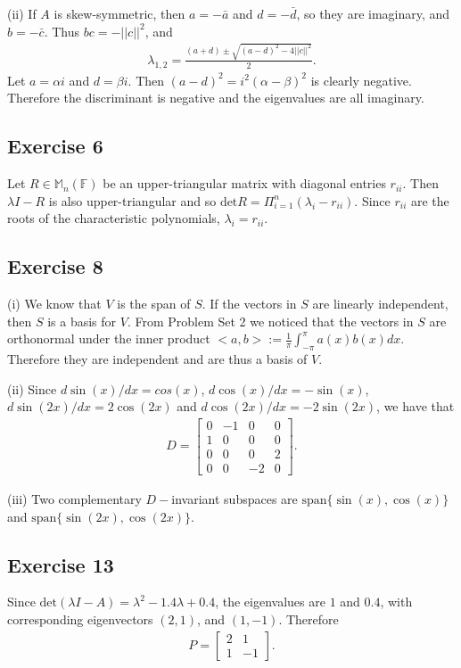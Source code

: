 \documentclass[11.5pt, letterpaper, bibtotoc,
    tablecaptionabove, figurecaptionabove]{article}
\begin{document}
(ii)
If $A$ is skew-symmetric, then $a=-\bar{a}$ and $d=-\bar{d}$, so they are imaginary, and $b=-\bar{c}$.
Thus $bc=-||c||^2$, and 
\begin{align*}
    \lambda_{1,2} = \frac{(a + d) \pm \sqrt{(a - d)^2 - 4||c||^2}}{2}.
\end{align*}
Let $a=\alpha i$ and $d=\beta i$. Then $(a-d)^2=i^2(\alpha-\beta)^2$ is clearly negative.
Therefore the discriminant is negative and the eigenvalues are all imaginary.

\subsection*{Exercise 6}
Let $R\in\mathbb M_n(\mathbb F)$ be an upper-triangular matrix with diagonal entries $r_{ii}$. 
Then $\lambda I-R$ is also upper-triangular and so $\text{det}R = \Pi_{i=1}^n(\lambda_i-r_{ii})$.
Since $r_{ii}$ are the roots of the characteristic polynomials, $\lambda_i=r_{ii}$.

\subsection*{Exercise 8}
(i)
We know that $V$ is the span of $S$.
If the vectors in $S$ are linearly independent, then $S$ is a basis for $V$.
From Problem Set 2 we noticed that the vectors in $S$ are orthonormal under the inner product
$<a,b>:=\frac{1}{\pi}\int_{-\pi}^{\pi}a(x)b(x)dx$.
Therefore they are independent and are thus a basis of $V$.

(ii)
Since $d\sin(x)/dx=cos(x)$, $d\cos(x)/dx=-\sin(x)$, $d\sin(2x)/dx=2\cos(2x)$ and
$d\cos(2x)/dx=-2\sin(2x)$, we have that
\begin{align*}
    D = 
    \begin{bmatrix}
        0 & -1 & 0 & 0\\
        1 & 0 & 0 & 0\\
        0 & 0 & 0 & 2\\
        0 & 0 & -2 & 0
    \end{bmatrix}.
\end{align*}

(iii)
Two complementary $D-$invariant subspaces are $\text{span}\{\sin(x), \cos(x)\}$
and $\text{span}\{\sin(2x), \cos(2x)\}$.

\subsection*{Exercise 13}
Since $\text{det}(\lambda I-A)=\lambda^2-1.4\lambda+0.4$, the eigenvalues are $1$ and $0.4$,
with corresponding eigenvectors $(2, 1)$, and $(1, -1)$.
Therefore
\begin{align*}
    P =
    \begin{bmatrix}
        2 & 1\\
        1 & -1
    \end{bmatrix}.
\end{align*}
\end{document}

